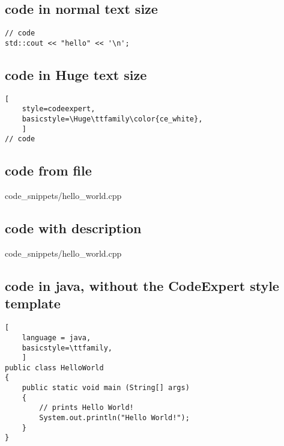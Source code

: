 \documentclass[a4paper,10pt,landscape]{scrartcl}
\begin{document}
\begin{multicols*}{3}
\subsection{code in normal text size}
\begin{lstlisting}[style = codeexpert]
// code
std::cout << "hello" << '\n';
\end{lstlisting}
%
\subsection{code in Huge text size} 
\begin{lstlisting}[
    style=codeexpert,
    basicstyle=\Huge\ttfamily\color{ce_white},
    ]
// code
\end{lstlisting}
%
\subsection{code from file}

        {code_snippets/hello_world.cpp}
%
\subsection{code with description}

        {code_snippets/hello_world.cpp}
\subsection{code in java, without the CodeExpert style template}
\begin{lstlisting}[
    language = java,
    basicstyle=\ttfamily,
    ]
public class HelloWorld 
{
    public static void main (String[] args)
    {
        // prints Hello World!
        System.out.println("Hello World!");
    }    
}
\end{lstlisting}
%  
\end{multicols*}
%
\end{document}
